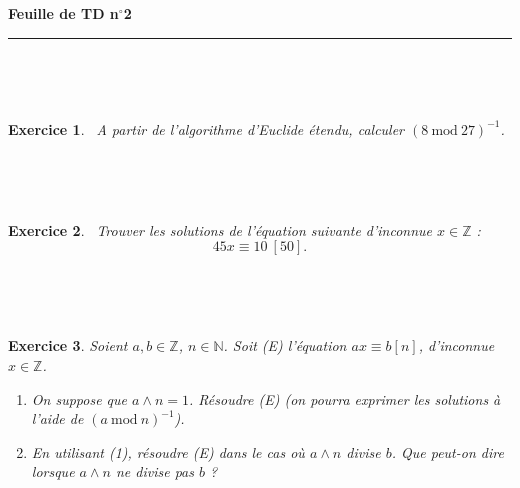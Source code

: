 \documentclass[11pt,a4paper]{article}
\title{}
\date{}
\newtheorem{ex}{Exercice}
\newcommand{\HRule}{\rule{\linewidth}{0.5mm}}
\newcommand{\N}{\mathbb{N}}
\newcommand{\Z}{\mathbb{Z}}
\begin{document}
\pagestyle{fancy}

\fancyhead{}
 \fancyfoot{}


\newcommand{\lb}{\llbracket}
\newcommand{\rb}{\rrbracket}


\newcommand{\md}[3]{#1\ \equiv \ #2 \! \! \! \! \! \pmod {#3} }
\newcommand{\nmd}[3]{#1 \not \equiv #2 \! \! \! \! \!  \pmod {#3} }
\newcommand{\mda}[3]{#1 \equiv #2 \! \!  \pmod {#3} }
\newcommand{\nmda}[3]{#1 \not \equiv #2 \! \! \pmod {#3} }
\newcommand{\mo}[2]{#1 \! \! \! \! \! \pmod #2 }
\newcommand{\moa}[2]{#1 \! \!  \pmod {#2} }


\thispagestyle{fancy}

\begin{center}
    { \huge \bfseries
    Feuille de TD n$^{\boldsymbol{\circ}}$2
     \\ [0cm] }
    \HRule \\[0.5cm]
\end{center}


\

\begin{ex}\label{inverse_modulaire}\
A partir de l'algorithme d'Euclide étendu, calculer $(8\mathrm{\ mod\ }27)^{-1}$.
\end{ex}


\

\

\begin{ex}\label{equation_lineaire_modulaire}\
Trouver les solutions de l'équation suivante d'inconnue $x\in \Z$ :
$$  {45x}\equiv {10}\  [{50}].    $$
\end{ex}



\

\



\begin{ex}\label{equation_lineaire_modulaire_generale}
Soient $a,b\in \Z$, $n\in \N$. Soit (E) l'équation $a x\equiv b[n]$, d'inconnue $x\in \Z$. \begin{enumerate}
\item On suppose que $a\wedge n=1$. Résoudre (E) (on pourra exprimer les solutions à l'aide de $(a \mathrm{\ mod\ }n)^{-1}$).

\item En utilisant (1), résoudre (E) dans le cas où $a\wedge n$  divise $b$. Que peut-on dire lorsque $a\wedge n$ ne divise pas $b$ ?
\end{enumerate}
\end{ex}
\end{document}
